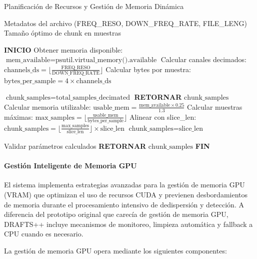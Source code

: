 \begin{algorithm}[H]
\caption{Planificación de Recursos y Gestión de Memoria Dinámica}
\label{alg:resource-planning}
\begin{algorithmic}[1]
\Require Metadatos del archivo (FREQ\_RESO, DOWN\_FREQ\_RATE, FILE\_LENG)
\Ensure Tamaño óptimo de chunk en muestras

\State \textbf{INICIO}
\State Obtener memoria disponible: $\text{mem\_available} = \text{psutil.virtual\_memory().available}$
\State Calcular canales decimados: $\text{channels\_ds} = \lfloor \frac{\text{FREQ\_RESO}}{\text{DOWN\_FREQ\_RATE}} \rfloor$
\State Calcular bytes por muestra: $\text{bytes\_per\_sample} = 4 \times \text{channels\_ds}$

    \State $\text{chunk\_samples} = \text{total\_samples\_decimated}$
    \State \textbf{RETORNAR} $\text{chunk\_samples}$
\Else
    \State Calcular memoria utilizable: $\text{usable\_mem} = \frac{\text{mem\_available} \times 0.25}{1.3}$
    \State Calcular muestras máximas: $\text{max\_samples} = \lfloor \frac{\text{usable\_mem}}{\text{bytes\_per\_sample}} \rfloor$
    \State Alinear con slice\_len: $\text{chunk\_samples} = \lfloor \frac{\text{max\_samples}}{\text{slice\_len}} \rfloor \times \text{slice\_len}$
        \State $\text{chunk\_samples} = \text{slice\_len}$ 
        \EndIf
\EndIf

\State Validar parámetros calculados
\State \textbf{RETORNAR} $\text{chunk\_samples}$
\State \textbf{FIN}
\end{algorithmic}
\end{algorithm}

\paragraph{Gestión Inteligente de Memoria GPU}

El sistema implementa estrategias avanzadas para la gestión de memoria GPU (VRAM) que optimizan el uso de recursos CUDA y previenen desbordamientos de memoria durante el procesamiento intensivo de dedispersión y detección. A diferencia del prototipo original que carecía de gestión de memoria GPU, DRAFTS++ incluye mecanismos de monitoreo, limpieza automática y fallback a CPU cuando es necesario.

La gestión de memoria GPU opera mediante los siguientes componentes:

